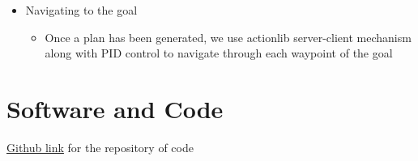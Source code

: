 \documentclass[a4paper,12pt,oneside]{book}
\begin{document}
\begin{itemize}
	\item Navigating to the goal
		\begin{itemize}
			\item Once a plan has been generated, we use actionlib server-client mechanism along with PID control to navigate through each waypoint of the goal
		\end{itemize}			
	
\end{itemize}

\section{Software and Code}
\href{https://github.com/eYSIP-2017/eYSIP-2017_Indoor-Environments-Mapping-using-UAV}{Github link} for the repository of code
\end{document}
